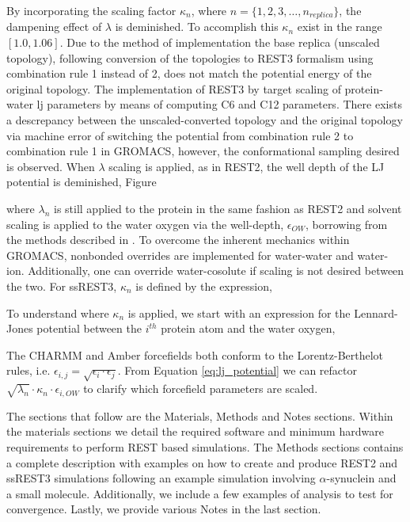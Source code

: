 By incorporating the scaling factor $\kappa_n$, where $n=\{1,2,3,\ldots,n_{replica}\}$, the dampening effect of $\lambda$ is deminished. 
To accomplish this $\kappa_n$ exist in the range $[1.0,1.06]$. 
Due to the method of implementation the base replica (unscaled topology), following conversion of the topologies to REST3 \cite{Zhang2023} formalism using combination rule 1 instead of 2, does not match the potential energy of the original topology. 
The implementation of REST3 by \citeauthor{Zhang2023} target scaling of protein-water lj parameters by means of computing C6 and C12 parameters. 
There exists a descrepancy between the unscaled-converted topology and the original topology via machine error of switching the potential from combination rule 2 to combination rule 1 in GROMACS, however, the conformational sampling desired is observed. When $\lambda$ scaling is applied, as in REST2, the well depth of the LJ potential is deminished, Figure 

where $\lambda_n$ is still applied to the protein in the same fashion as REST2 \cite{Wang2011} and solvent scaling is applied to the water oxygen via the well-depth, $\epsilon_{OW}$, borrowing from the methods described in \citeauthor{Best2010} \citeyear{Best2010}. 
To overcome the inherent mechanics within GROMACS\cite{VanDerSpoel2005}, nonbonded overrides are implemented for water-water and water-ion.
Additionally, one can override water-cosolute if scaling is not desired between the two. 
For ssREST3, $\kappa_n$ is defined by the expression, 


To understand where $\kappa_n$ is applied, we start with an expression for the Lennard-Jones potential between the $i^{th}$ protein atom and the water oxygen,


The CHARMM and Amber forcefields both conform to the Lorentz-Berthelot rules, i.e. $\epsilon_{i,j}=\sqrt{\epsilon_i\cdot \epsilon_j}$. From Equation \ref{eq:lj_potential} we can refactor $\sqrt{\lambda_n}\cdot\kappa_n\cdot\epsilon_{i,OW}$ to clarify which forcefield parameters are scaled. 


The sections that follow are the Materials, Methods and Notes sections.
Within the materials sections we detail the required software and minimum hardware requirements to perform REST based simulations.
The Methods sections contains a complete description with examples on how to create and produce REST2 and ssREST3 simulations following an example simulation involving $\alpha$-synuclein and a small molecule. Additionally, we include a few examples of analysis to test for convergence. Lastly, we provide various Notes in the last section. 